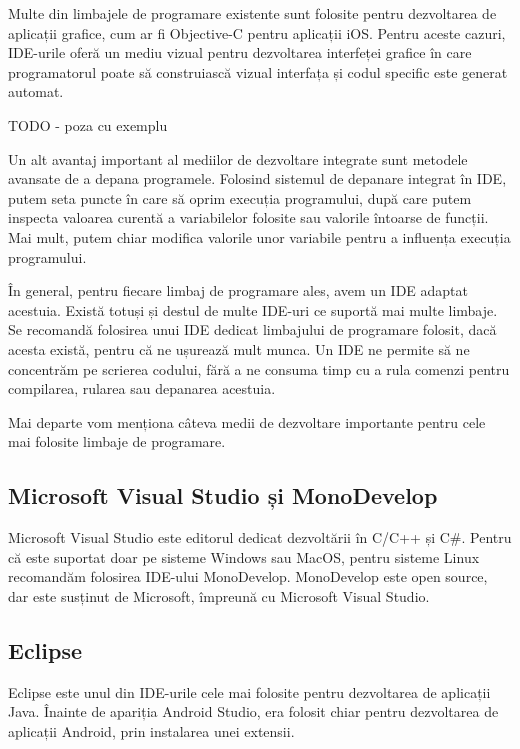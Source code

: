 Multe din limbajele de programare existente sunt folosite pentru dezvoltarea de
aplicații grafice, cum ar fi Objective-C pentru aplicații iOS. Pentru aceste
cazuri, IDE-urile oferă un mediu vizual pentru dezvoltarea interfeței grafice în
care programatorul poate să construiască vizual interfața și codul specific este
generat automat.

TODO - poza cu exemplu

Un alt avantaj important al mediilor de dezvoltare integrate sunt metodele
avansate de a depana programele. Folosind sistemul de depanare integrat în IDE,
putem seta puncte în care să oprim execuția programului, după care putem
inspecta valoarea curentă a variabilelor folosite sau valorile întoarse de
funcții. Mai mult, putem chiar modifica valorile unor variabile pentru a
influența execuția programului.

În general, pentru fiecare limbaj de programare ales, avem un IDE adaptat
acestuia. Există totuși și destul de multe IDE-uri ce suportă mai multe limbaje.
Se recomandă folosirea unui IDE dedicat limbajului de programare folosit, dacă
acesta există, pentru că ne ușurează mult munca. Un IDE ne permite să ne
concentrăm pe scrierea codului, fără a ne consuma timp cu a rula comenzi pentru
compilarea, rularea sau depanarea acestuia.

Mai departe vom menționa câteva medii de dezvoltare importante pentru cele mai
folosite limbaje de programare.

\subsection{Microsoft Visual Studio și MonoDevelop}
\label{sec:appdev-ide-vs-mono}

Microsoft Visual Studio este editorul dedicat dezvoltării în C/C++ și C\#.
Pentru că este suportat doar pe sisteme Windows sau MacOS, pentru sisteme Linux
recomandăm folosirea IDE-ului MonoDevelop. MonoDevelop este open source, dar
este susținut de Microsoft, împreună cu Microsoft Visual Studio.

\subsection{Eclipse}
\label{sec:appdev-ide-eclipse}

Eclipse este unul din IDE-urile cele mai folosite pentru dezvoltarea de
aplicații Java. Înainte de apariția Android Studio, era folosit chiar pentru
dezvoltarea de aplicații Android, prin instalarea unei extensii.

